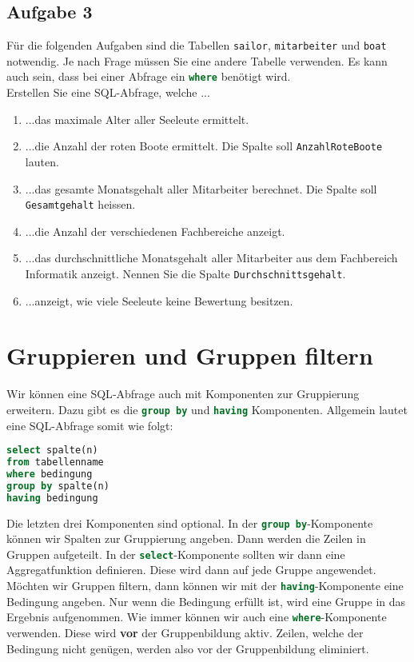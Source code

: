 \subsection{Aufgabe 3}

Für die folgenden Aufgaben sind die Tabellen \lstinline{sailor}, \lstinline{mitarbeiter} und \lstinline{boat} notwendig. Je nach Frage müssen Sie eine andere Tabelle verwenden. Es kann auch sein, dass bei einer Abfrage ein \lstinline[language=SQL]{where} benötigt wird.\\

Erstellen Sie eine \ac{SQL}-Abfrage, welche ...

\begin{enumerate}
\item ...das maximale Alter aller Seeleute ermittelt.
\item ...die Anzahl der roten Boote ermittelt. Die Spalte soll \lstinline{AnzahlRoteBoote} lauten.
\item ...das gesamte Monatsgehalt aller Mitarbeiter berechnet. Die Spalte soll \lstinline{Gesamtgehalt} heissen.
\item ...die Anzahl der verschiedenen Fachbereiche anzeigt.
\item ...das durchschnittliche Monatsgehalt aller Mitarbeiter aus dem Fachbereich Informatik anzeigt. Nennen Sie die Spalte \lstinline{Durchschnittsgehalt}.
\item ...anzeigt, wie viele Seeleute keine Bewertung besitzen.

\end{enumerate}

\newpage

\section{Gruppieren und Gruppen filtern}

Wir können eine \ac{SQL}-Abfrage auch mit Komponenten zur Gruppierung erweitern. Dazu gibt es die \lstinline[language=SQL]{group by} und \lstinline[language=SQL]{having} Komponenten. Allgemein lautet eine \ac{SQL}-Abfrage somit wie folgt:

\begin{lstlisting}[language=SQL]
select spalte(n)
from tabellenname
where bedingung
group by spalte(n)
having bedingung
\end{lstlisting}

Die letzten drei Komponenten sind optional. In der \lstinline[language=SQL]{group by}-Komponente können wir Spalten zur Gruppierung angeben. Dann werden die Zeilen in Gruppen aufgeteilt. In der \lstinline[language=SQL]{select}-Komponente sollten wir dann eine Aggregatfunktion definieren. Diese wird dann auf jede Gruppe angewendet. Möchten wir Gruppen filtern, dann können wir mit der \lstinline[language=SQL]{having}-Komponente eine Bedingung angeben. Nur wenn die Bedingung erfüllt ist, wird eine Gruppe in das Ergebnis aufgenommen. Wie immer können wir auch eine \lstinline[language=SQL]{where}-Komponente verwenden. Diese wird \textbf{vor} der Gruppenbildung aktiv. Zeilen, welche der Bedingung nicht genügen, werden also vor der Gruppenbildung eliminiert.


